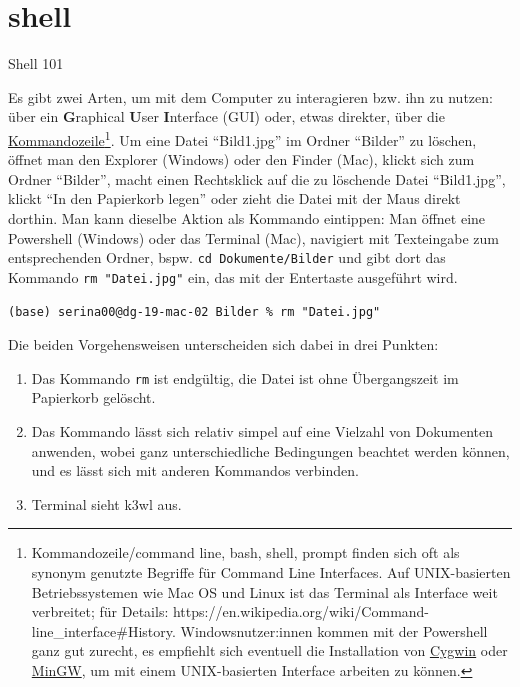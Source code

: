 \documentclass[
  letterpaper,
]{book}
\providecommand{\tightlist}{%
  \setlength{\itemsep}{0pt}\setlength{\parskip}{0pt}}\usepackage{longtable,booktabs,array}
\begin{document}

\hypertarget{shell}{%
\chapter{shell}\label{shell}}

Shell 101

Es gibt zwei Arten, um mit dem Computer zu interagieren bzw. ihn zu
nutzen: über ein \textbf{G}raphical \textbf{U}ser \textbf{I}nterface
(GUI) oder, etwas direkter, über die
\href{https://de.wikipedia.org/wiki/Kommandozeile}{Kommandozeile}\footnote{Kommandozeile/command
  line, bash, shell, prompt finden sich oft als synonym genutzte
  Begriffe für Command Line Interfaces. Auf UNIX-basierten
  Betriebssystemen wie Mac OS und Linux ist das Terminal als Interface
  weit verbreitet; für Details:
  https://en.wikipedia.org/wiki/Command-line\_interface\#History.
  Windowsnutzer:innen kommen mit der Powershell ganz gut zurecht, es
  empfiehlt sich eventuell die Installation von
  \href{https://en.wikipedia.org/wiki/Cygwin}{Cygwin} oder
  \href{https://en.wikipedia.org/wiki/MinGW}{MinGW}, um mit einem
  UNIX-basierten Interface arbeiten zu können.}. Um eine Datei
``Bild1.jpg'' im Ordner ``Bilder'' zu löschen, öffnet man den Explorer
(Windows) oder den Finder (Mac), klickt sich zum Ordner ``Bilder'',
macht einen Rechtsklick auf die zu löschende Datei ``Bild1.jpg'', klickt
``In den Papierkorb legen'' oder zieht die Datei mit der Maus direkt
dorthin. Man kann dieselbe Aktion als Kommando eintippen: Man öffnet
eine Powershell (Windows) oder das Terminal (Mac), navigiert mit
Texteingabe zum entsprechenden Ordner, bspw.
\texttt{cd\ Dokumente/Bilder} und gibt dort das Kommando
\texttt{rm\ "Datei.jpg"} ein, das mit der Entertaste ausgeführt wird.

\texttt{(base)\ serina00@dg-19-mac-02\ Bilder\ \%\ rm\ "Datei.jpg"}

Die beiden Vorgehensweisen unterscheiden sich dabei in drei Punkten:

\begin{enumerate}
\def\labelenumi{\arabic{enumi}.}
\tightlist
\item
  Das Kommando \texttt{rm} ist endgültig, die Datei ist ohne
  Übergangszeit im Papierkorb gelöscht.
\item
  Das Kommando lässt sich relativ simpel auf eine Vielzahl von
  Dokumenten anwenden, wobei ganz unterschiedliche Bedingungen beachtet
  werden können, und es lässt sich mit anderen Kommandos verbinden.
\item
  Terminal sieht k3wl aus.
\end{enumerate}
\end{document}
